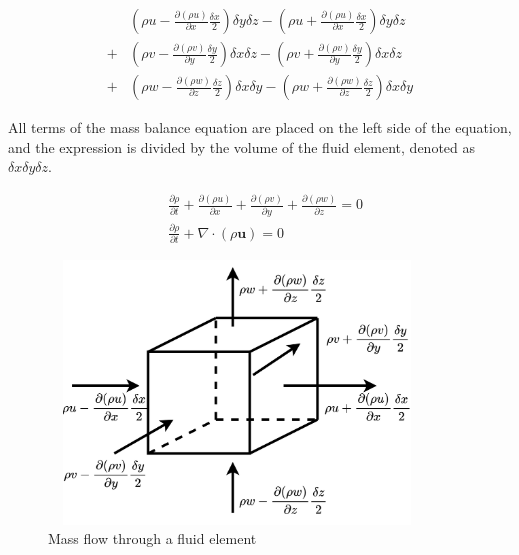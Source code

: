 \documentclass{apmcmthesis}
\begin{document}
\begin{equation}
\begin{aligned}
&(\rho u-\frac{\partial (\rho u)}{\partial x}\frac{\delta x}{2}  )\delta y\delta z-(\rho u+\frac{\partial (\rho u)}{\partial x}\frac{\delta x}{2}  )\delta y\delta z\\
+&(\rho v-\frac{\partial (\rho v)}{\partial y}\frac{\delta y}{2}  )\delta x\delta z-(\rho v+\frac{\partial (\rho v)}{\partial y}\frac{\delta y}{2}  )\delta x\delta z\\
+&(\rho w-\frac{\partial (\rho w)}{\partial z}\frac{\delta z}{2}  )\delta x\delta y-(\rho w+\frac{\partial (\rho w)}{\partial z}\frac{\delta z}{2}  )\delta x\delta y
\end{aligned}
\end{equation}

All terms of the mass balance equation are placed on the left side of the equation, and the expression is divided by the volume of the fluid element, denoted as $\delta x\delta y\delta z$.

\begin{equation}
\begin{aligned}
&\frac{\partial \rho }{\partial t}+\frac{\partial (\rho u)}{\partial x}+\frac{\partial (\rho v)}{\partial y}+\frac{\partial (\rho w)}{\partial z}=0\\
&\frac{\partial \rho }{\partial t}+\nabla\cdot (\rho \textbf{u})=0
\end{aligned}
\end{equation}

\begin{figure}[htbp]
  \centering
  \includegraphics[width=10cm,height=7cm]{figures/Mass flow through a fluid element.png}
  \caption{Mass flow through a fluid element}
  \label{Mass flow through a fluid element}
\end{figure}
\end{document}
